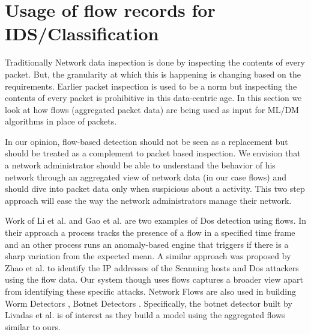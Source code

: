 \section{Usage of flow records for IDS/Classification}

Traditionally Network data inspection is done by inspecting the contents of every packet. But, the granularity at which this is happening is changing based on the requirements. Earlier packet inspection is used to be a norm but inspecting the contents of every packet is prohibitive in this data-centric age. In this section we look at how flows (aggregated packet data) are being used as input for ML/DM algorithms in place of packets.

In our opinion, flow-based detection should not be seen as a replacement but should be treated as a complement to packet based inspection. We envision that a network administrator should be able to understand the behavior of his network through an aggregated view of network data (in our case flows) and should dive into packet data only when suspicious about a activity. This two step approach will ease the way the network administrators manage their network.

Work of Li et al. \cite{gao2005towards} and Gao et al. \cite{gao2006resilient} are two examples of Dos detection using flows. In their approach a process tracks the presence of a flow in a specified time frame and an other process runs an anomaly-based engine that triggers if there is a sharp variation from the expected mean. A similar approach was proposed by Zhao et al.\cite{zhao2006detection} to identify the IP addresses of the Scanning hosts and Dos attackers using the flow data. Our system though uses flows captures a broader view apart from identifying these specific attacks. Network Flows are also used in building Worm Detectors \cite{dubendorfer2005framework} \cite{diibendorfer2005host}, Botnet Detectors \cite{strayer2008botnet} \cite{livadas2006usilng} \cite{karasaridis2007wide}. Specifically, the botnet detector built by Livadas et al.  \cite{livadas2006usilng} is of interest as they  build a model using the aggregated flows similar to ours.

